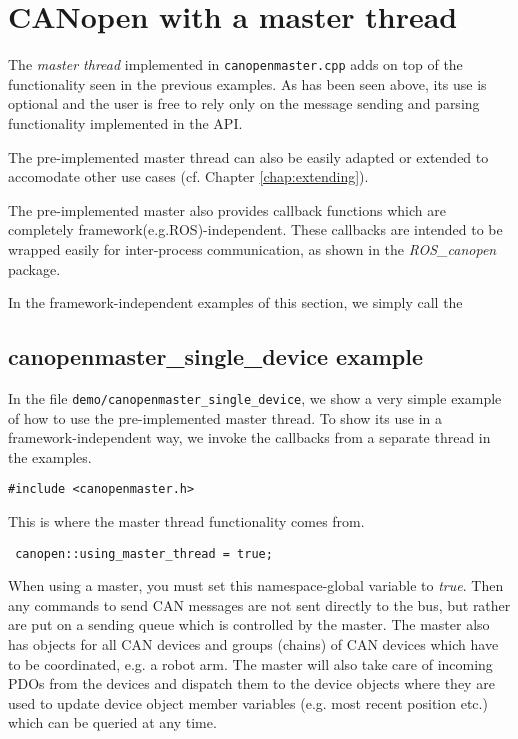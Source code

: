 \section{CANopen with a master thread}

The {\em master thread} implemented in \texttt{canopenmaster.cpp} adds on top of the functionality seen in the previous examples. As has been seen above, its use is optional and the user is free to rely only on the message sending and parsing functionality implemented in the API.

The pre-implemented master thread can also be easily adapted or extended to accomodate other use cases (cf. Chapter \ref{chap:extending}).

The pre-implemented master also provides callback functions which are completely framework(e.g.ROS)-independent. These callbacks are intended to be wrapped easily for inter-process communication, as shown in the  {\em ROS\_canopen} package. 

In the framework-independent examples of this section, we simply call the 

\subsection{canopenmaster\_single\_device example}

In the file \texttt{demo/canopenmaster\_single\_device}, we show a very simple example of how to use the pre-implemented master thread. To show its use in a framework-independent way, we invoke the callbacks from a separate thread in the examples. 

\begin{verbatim}
#include <canopenmaster.h>
 \end{verbatim}
This is where the master thread functionality comes from.

\begin{verbatim}
 canopen::using_master_thread = true;
 \end{verbatim}
When using a master, you must set this namespace-global variable to {\em true}. Then any commands to send CAN messages are not sent directly to the bus, but rather are put on a sending queue which is controlled by the master. The master also has objects for all CAN devices and groups (chains) of CAN devices which have to be coordinated, e.g. a robot arm. The master will also take care of incoming PDOs from the devices and dispatch them to the device objects where they are used to update device object member variables (e.g. most recent position etc.) which can be queried at any time.

